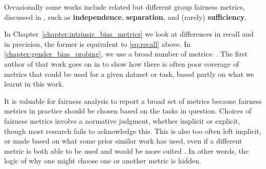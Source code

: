 Occasionally some works include related but different group fairness metrics, discussed in \citet{barocas-hardt-narayanan}, such as \textbf{independence}, \textbf{separation}, and (rarely) \textbf{sufficiency}. 



In Chapter~\ref{chapter:intrinsic_bias_metrics} we look at differences in recall and in precision, the former is equivalent to \ref{eq:recall} above. In \ref{chapter:gender_bias_probing}, we use a broad number of metrics: . The first author of that work goes on in \citet{orgad-belinkov-2022-choose} to show how there is often poor coverage of metrics that could be used for a given dataset or task, based partly on what we learnt in this work. 

It is valuable for fairness analysis to report a broad set of metrics because fairness metrics in practice should be chosen based on the tasks in question. 
Choices of fairness metrics involve a normative judgment, whether implicit or explicit, though most research fails to acknowledge this. This is also too often left implicit, or made based on what some prior similar work has used, even if a different metric is both able to be used and would be more suited \citep{orgad-belinkov-2022-choose}. In other words, the logic of why one might choose one or another metric is hidden. 

